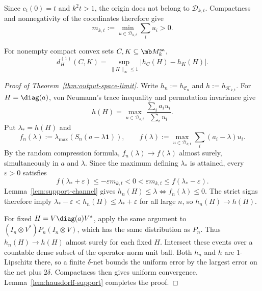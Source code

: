 Since $c_t(0)=t$ and $k^2t>1$, the origin does not belong to
$\mathscr D_{k,t}$.  Compactness and nonnegativity of the coordinates
therefore give
\begin{equation}
    m_{k,t}:=\min_{u\in\mathscr D_{k,t}}\sum_i u_i>0.
    \label{eq:positive-total-mass}
\end{equation}

For nonempty compact convex sets $C,K\subseteq\mb M_k^{\rm sa}$,
\begin{equation}
    d_H^{(1)}(C,K)
    =\sup_{\|H\|_\infty\le1}\bigl|h_C(H)-h_K(H)\bigr|.
\end{equation}

\begin{proof}[Proof of Theorem~\ref{thm:output-space-limit}]
Write $h_n:=h_{\mathscr C_n}$ and $h:=h_{\mathscr K_{k,t}}$.
For $H=\diag(a)$, von Neumann's trace inequality and permutation
invariance give
\begin{equation}
    h(H)=\max_{u\in\mathscr D_{k,t}}
       \frac{\sum_i a_i u_i}{\sum_i u_i}.
\end{equation}
Put $\lambda_*=h(H)$ and
\begin{equation}
    f_n(\lambda):=\lambda_{\max}(S_n(a-\lambda\mathbf1)),
    \qquad
    f(\lambda):=\max_{u\in\mathscr D_{k,t}}
       \sum_i(a_i-\lambda)u_i.
\end{equation}
By the random compression formula, $f_n(\lambda)\to f(\lambda)$
almost surely, simultaneously in $a$ and $\lambda$.  Since the
maximum defining $\lambda_*$ is attained, every $\varepsilon>0$
satisfies
\begin{equation}
    f(\lambda_*+\varepsilon)\le-\varepsilon m_{k,t}<0
    <\varepsilon m_{k,t}\le f(\lambda_*-\varepsilon).
\end{equation}
Lemma~\ref{lem:support-channel} gives
$h_n(H)\le\lambda\iff f_n(\lambda)\le0$.  The strict signs therefore
imply $\lambda_*-\varepsilon<h_n(H)\le\lambda_*+\varepsilon$ for all
large $n$, so $h_n(H)\to h(H)$.

For fixed $H=V\diag(a)V^*$, apply the same argument to
$(I_n\otimes V^*)P_n(I_n\otimes V)$, which has the same distribution
as $P_n$.  Thus $h_n(H)\to h(H)$ almost surely for each fixed $H$.
Intersect these events over a countable dense subset of the
operator-norm unit ball.  Both $h_n$ and $h$ are $1$-Lipschitz there,
so a finite $\delta$-net bounds the uniform error by the largest
error on the net plus $2\delta$.  Compactness then gives uniform
convergence.  Lemma~\ref{lem:hausdorff-support} completes the proof.
\end{proof}
